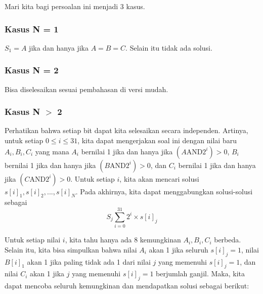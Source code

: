 \documentclass[../main_editorial.tex]{subfiles} %
\begin{document}
Mari kita bagi persoalan ini menjadi 3 kasus.
\subsubsection*{Kasus N = 1}

$S_1 = A$ jika dan hanya jika $A = B = C$. Selain itu tidak ada solusi.

\subsubsection*{Kasus N = 2}

Bisa diselesaikan sesuai pembahasan di versi mudah.

\subsubsection*{Kasus N $ > $ 2}

Perhatikan bahwa setiap bit dapat kita selesaikan secara independen. Artinya, untuk setiap $0 \le i \le 31$, kita dapat mengerjakan soal ini dengan nilai baru $A_i, B_i, C_i$ yang mana $A_i$ bernilai 1 jika dan hanya jika $(A \mathrm{AND} 2^i) > 0 $, $B_i$ bernilai 1 jika dan hanya jika $(B \mathrm{AND} 2^i) > 0 $, dan $C_i$ bernilai 1 jika dan hanya jika $(C \mathrm{AND} 2^i) > 0 $. Untuk setiap $i$, kita akan mencari solusi $s[i]_1, s[i]_2, ..., s[i]_N$. Pada akhirnya, kita dapat menggabungkan solusi-solusi sebagai $$S_j \sum_{i=0}^{31} 2^i \times s[i]_j$$

Untuk setiap nilai $i$, kita tahu hanya ada 8 kemungkinan $A_i, B_i, C_i$ berbeda. Selain itu, kita bisa simpulkan bahwa nilai $A_i$ akan 1 jika seluruh $s[i]_j = 1$, nilai $B[i]_1$ akan 1 jika paling tidak ada 1 dari nilai $j$ yang memenuhi $s[i]_j = 1$, dan nilai $C_i$ akan 1 jika $j$ yang memenuhi $s[i]_j = 1$ berjumlah ganjil. Maka, kita dapat mencoba seluruh kemungkinan dan mendapatkan solusi sebagai berikut:
\end{document}
